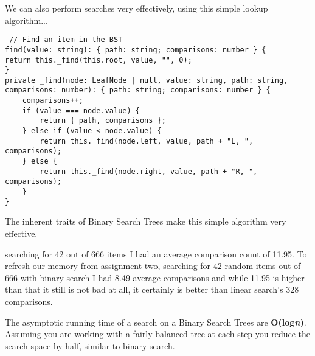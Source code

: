\documentclass[12pt,letterpaper, onecolumn]{exam}
\begin{document}
\vspace{.3cm}
\centering We can also perform searches very effectively, using this simple lookup algorithm... 

\vspace{.2cm}
\begin{lstlisting}
 // Find an item in the BST
find(value: string): { path: string; comparisons: number } {
return this._find(this.root, value, "", 0);
}
private _find(node: LeafNode | null, value: string, path: string, comparisons: number): { path: string; comparisons: number } {
    comparisons++;
    if (value === node.value) {
        return { path, comparisons };
    } else if (value < node.value) {
        return this._find(node.left, value, path + "L, ", comparisons);
    } else {
        return this._find(node.right, value, path + "R, ", comparisons);
    }
}
\end{lstlisting}

\newpage

\centering The inherent traits of Binary Search Trees make this simple algorithm very effective. 

\vspace{.2cm}

\centering searching for 42 out of 666 items I had an average comparison count of 11.95. To refresh our memory from assignment two, searching for 42 random items out of 666 with binary search I had 8.49 average comparisons and while 11.95 is higher than that it still is not bad at all, it certainly is better than linear search's 328 comparisons. 

\vspace{.3cm} 

\centering The asymptotic running time of a search on a Binary Search Trees are \textbf{O(log\textit{n})}. Assuming you are working with a fairly balanced tree at each step you reduce the search space by half, similar to binary search. 
\end{document}
